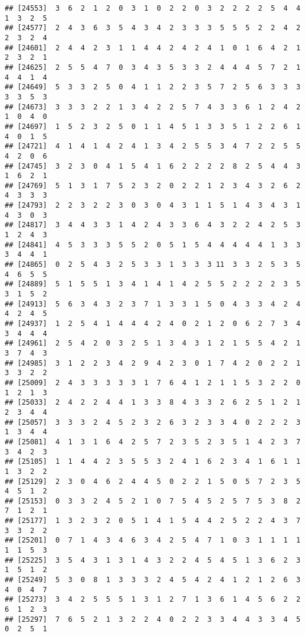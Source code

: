 \documentclass[
]{article}
\begin{document}
\begin{verbatim}
## [24553]  3  6  2  1  2  0  3  1  0  2  2  0  3  2  2  2  2  5  4  4  1  3  2  5
## [24577]  2  4  3  6  3  5  4  3  4  2  3  3  3  5  5  5  2  2  4  2  2  3  2  4
## [24601]  2  4  4  2  3  1  1  4  4  2  4  2  4  1  0  1  6  4  2  1  2  3  2  1
## [24625]  2  5  5  4  7  0  3  4  3  5  3  3  2  4  4  4  5  7  2  1  4  4  1  4
## [24649]  5  3  3  2  5  0  4  1  1  2  2  3  5  7  2  5  6  3  3  3  3  3  5  3
## [24673]  3  3  3  2  2  1  3  4  2  2  5  7  4  3  3  6  1  2  4  2  1  0  4  0
## [24697]  1  5  2  3  2  5  0  1  1  4  5  1  3  3  5  1  2  2  6  1  4  0  1  5
## [24721]  4  1  4  1  4  2  4  1  3  4  2  5  5  3  4  7  2  2  5  5  4  2  0  6
## [24745]  3  2  3  0  4  1  5  4  1  6  2  2  2  2  8  2  5  4  4  3  1  6  2  1
## [24769]  5  1  3  1  7  5  2  3  2  0  2  2  1  2  3  4  3  2  6  2  4  3  3  3
## [24793]  2  2  3  2  2  3  0  3  0  4  3  1  1  5  1  4  3  4  3  1  4  3  0  3
## [24817]  3  4  4  3  3  1  4  2  4  3  3  6  4  3  2  2  4  2  5  3  1  2  4  3
## [24841]  4  5  3  3  3  5  5  2  0  5  1  5  4  4  4  4  4  1  3  3  3  4  4  1
## [24865]  0  2  5  4  3  2  5  3  3  1  3  3  3 11  3  3  2  5  3  5  4  6  5  5
## [24889]  5  1  5  5  1  3  4  1  4  1  4  2  5  5  2  2  2  2  3  5  3  1  5  2
## [24913]  5  6  3  4  3  2  3  7  1  3  3  1  5  0  4  3  3  4  2  4  4  2  4  5
## [24937]  1  2  5  4  1  4  4  4  2  4  0  2  1  2  0  6  2  7  3  4  3  4  4  4
## [24961]  2  5  4  2  0  3  2  5  1  3  4  3  1  2  1  5  5  4  2  1  3  7  4  3
## [24985]  3  1  2  2  3  4  2  9  4  2  3  0  1  7  4  2  0  2  2  1  3  3  2  2
## [25009]  2  4  3  3  3  3  3  1  7  6  4  1  2  1  1  5  3  2  2  0  1  2  1  3
## [25033]  2  4  2  2  4  4  1  3  3  8  4  3  3  2  6  2  5  1  2  1  2  3  4  4
## [25057]  3  3  3  2  4  5  2  3  2  6  3  2  3  3  4  0  2  2  2  3  1  3  4  4
## [25081]  4  1  3  1  6  4  2  5  7  2  3  5  2  3  5  1  4  2  3  7  3  4  2  3
## [25105]  1  1  4  4  2  3  5  5  3  2  4  1  6  2  3  4  1  6  1  1  1  3  2  2
## [25129]  2  3  0  4  6  2  4  4  5  0  2  2  1  5  0  5  7  2  3  5  4  5  1  2
## [25153]  0  3  3  2  4  5  2  1  0  7  5  4  5  2  5  7  5  3  8  2  7  1  2  1
## [25177]  1  3  2  3  2  0  5  1  4  1  5  4  4  2  5  2  2  4  3  7  3  3  2  2
## [25201]  0  7  1  4  3  4  6  3  4  2  5  4  7  1  0  3  1  1  1  1  1  1  5  3
## [25225]  3  5  4  3  1  3  1  4  3  2  2  4  5  4  5  1  3  6  2  3  1  5  1  2
## [25249]  5  3  0  8  1  3  3  3  2  4  5  4  2  4  1  2  1  2  6  3  4  0  4  7
## [25273]  3  4  2  5  5  5  1  3  1  2  7  1  3  6  1  4  5  6  2  2  6  1  2  3
## [25297]  7  6  5  2  1  3  2  2  4  0  2  2  3  3  4  4  3  3  4  5  0  2  5  1

\end{verbatim}
\end{document}
